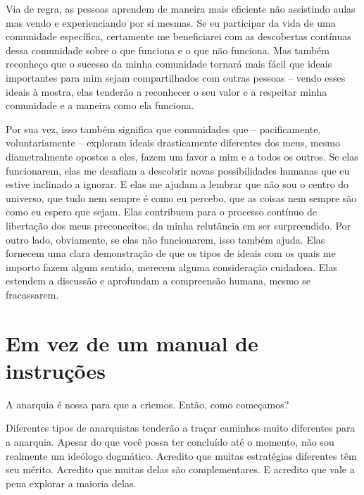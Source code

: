 Via de regra, as pessoas aprendem de maneira mais eficiente não assistindo aulas mas vendo e experienciando por si mesmas. Se eu participar da vida de uma comunidade específica, certamente me beneficiarei com as descobertas contínuas dessa comunidade sobre o que funciona e o que não funciona. Mas também reconheço que o sucesso da minha comunidade tornará mais fácil que ideais importantes para mim sejam compartilhados com outras pessoas -- vendo esses ideais à mostra, elas tenderão a reconhecer o seu valor e a respeitar minha comunidade e a maneira como ela funciona.

Por sua vez, isso também significa que comunidades que -- pacificamente, voluntariamente -- exploram ideais drasticamente diferentes dos meus, mesmo diametralmente opostos a eles, fazem um favor a mim e a todos os outros. Se elas funcionarem, elas me desafiam a descobrir novas possibilidades humanas que eu estive inclinado a ignorar. E elas me ajudam a lembrar que não sou o centro do universo, que tudo nem sempre é como eu percebo, que as coisas nem sempre são como eu espero que sejam. Elas contribuem para o processo contínuo de libertação dos meus preconceitos, da minha relutância em ser surpreendido. Por outro lado, obviamente, se elas não funcionarem, isso também ajuda. Elas fornecem uma clara demonstração de que os tipos de ideais com os quais me importo fazem algum sentido, merecem alguma consideração cuidadosa. Elas estendem a discussão e aprofundam a compreensão humana, mesmo se fracassarem.

\section{Em vez de um manual de instruções}

A anarquia é nossa para que a criemos. Então, como começamos?

Diferentes tipos de anarquistas tenderão a traçar caminhos muito diferentes para a anarquia. Apesar do que você possa ter concluído até o momento, não sou realmente um ideólogo dogmático. Acredito que muitas estratégias diferentes têm seu mérito. Acredito que muitas delas são complementares. E acredito que vale a pena explorar a maioria delas.

